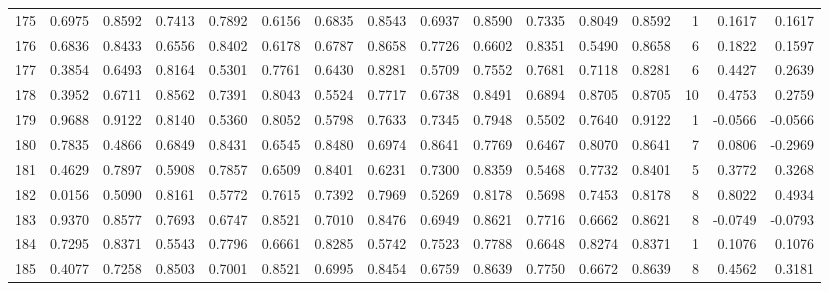 \begin{tabular}{lrrrrrrrrrrrrrrr}
175 &      0.6975 &  0.8592 &  0.7413 &  0.7892 &  0.6156 &  0.6835 &  0.8543 &  0.6937 &  0.8590 &  0.7335 &   0.8049 &     0.8592 &      1 &                    0.1617 &                     0.1617 \\
176 &      0.6836 &  0.8433 &  0.6556 &  0.8402 &  0.6178 &  0.6787 &  0.8658 &  0.7726 &  0.6602 &  0.8351 &   0.5490 &     0.8658 &      6 &                    0.1822 &                     0.1597 \\
177 &      0.3854 &  0.6493 &  0.8164 &  0.5301 &  0.7761 &  0.6430 &  0.8281 &  0.5709 &  0.7552 &  0.7681 &   0.7118 &     0.8281 &      6 &                    0.4427 &                     0.2639 \\
178 &      0.3952 &  0.6711 &  0.8562 &  0.7391 &  0.8043 &  0.5524 &  0.7717 &  0.6738 &  0.8491 &  0.6894 &   0.8705 &     0.8705 &     10 &                    0.4753 &                     0.2759 \\
179 &      0.9688 &  0.9122 &  0.8140 &  0.5360 &  0.8052 &  0.5798 &  0.7633 &  0.7345 &  0.7948 &  0.5502 &   0.7640 &     0.9122 &      1 &                   -0.0566 &                    -0.0566 \\
180 &      0.7835 &  0.4866 &  0.6849 &  0.8431 &  0.6545 &  0.8480 &  0.6974 &  0.8641 &  0.7769 &  0.6467 &   0.8070 &     0.8641 &      7 &                    0.0806 &                    -0.2969 \\
181 &      0.4629 &  0.7897 &  0.5908 &  0.7857 &  0.6509 &  0.8401 &  0.6231 &  0.7300 &  0.8359 &  0.5468 &   0.7732 &     0.8401 &      5 &                    0.3772 &                     0.3268 \\
182 &      0.0156 &  0.5090 &  0.8161 &  0.5772 &  0.7615 &  0.7392 &  0.7969 &  0.5269 &  0.8178 &  0.5698 &   0.7453 &     0.8178 &      8 &                    0.8022 &                     0.4934 \\
183 &      0.9370 &  0.8577 &  0.7693 &  0.6747 &  0.8521 &  0.7010 &  0.8476 &  0.6949 &  0.8621 &  0.7716 &   0.6662 &     0.8621 &      8 &                   -0.0749 &                    -0.0793 \\
184 &      0.7295 &  0.8371 &  0.5543 &  0.7796 &  0.6661 &  0.8285 &  0.5742 &  0.7523 &  0.7788 &  0.6648 &   0.8274 &     0.8371 &      1 &                    0.1076 &                     0.1076 \\
185 &      0.4077 &  0.7258 &  0.8503 &  0.7001 &  0.8521 &  0.6995 &  0.8454 &  0.6759 &  0.8639 &  0.7750 &   0.6672 &     0.8639 &      8 &                    0.4562 &                     0.3181 \\

\end{tabular}
